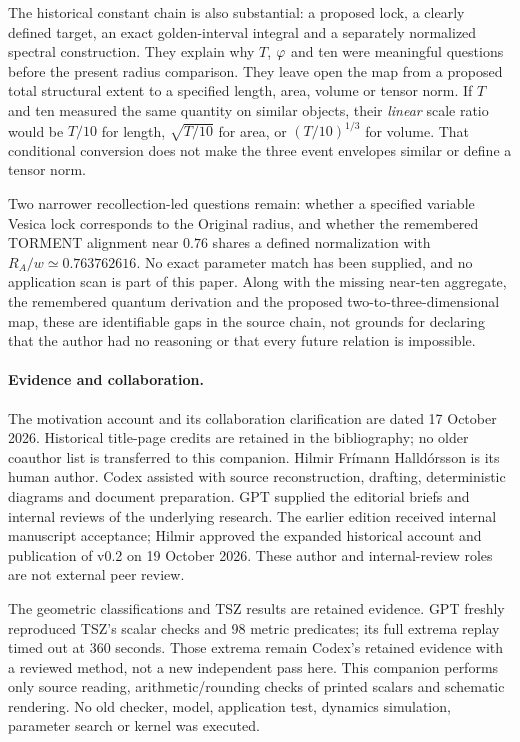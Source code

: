 The historical constant chain is also substantial: a proposed lock, a clearly defined target, an exact golden-interval integral and a separately normalized spectral construction. They explain why $T$, $\varphi$ and ten were meaningful questions before the present radius comparison. They leave open the map from a proposed total structural extent to a specified length, area, volume or tensor norm. If $T$ and ten measured the same quantity on similar objects, their \emph{linear} scale ratio would be $T/10$ for length, $\sqrt{T/10}$ for area, or $(T/10)^{1/3}$ for volume. That conditional conversion does not make the three event envelopes similar or define a tensor norm.~\cite[Sec.~14]{SP}

Two narrower recollection-led questions remain: whether a specified variable Vesica lock corresponds to the Original radius, and whether the remembered TORMENT alignment near $0.76$ shares a defined normalization with $R_A/w\simeq0.763762616$. No exact parameter match has been supplied, and no application scan is part of this paper. Along with the missing near-ten aggregate, the remembered quantum derivation and the proposed two-to-three-dimensional map, these are identifiable gaps in the source chain, not grounds for declaring that the author had no reasoning or that every future relation is impossible.~\cite{Intent}

\paragraph{Evidence and collaboration.}
The motivation account and its collaboration clarification are dated 17 October 2026. Historical title-page credits are retained in the bibliography; no older coauthor list is transferred to this companion. Hilmir Fr\'imann Halld\'orsson is its human author. Codex assisted with source reconstruction, drafting, deterministic diagrams and document preparation. GPT supplied the editorial briefs and internal reviews of the underlying research. The earlier edition received internal manuscript acceptance; Hilmir approved the expanded historical account and publication of v0.2 on 19 October 2026. These author and internal-review roles are not external peer review.

The geometric classifications and TSZ results are retained evidence. GPT freshly reproduced TSZ's scalar checks and 98 metric predicates; its full extrema replay timed out at 360 seconds. Those extrema remain Codex's retained evidence with a reviewed method, not a new independent pass here. This companion performs only source reading, arithmetic/rounding checks of printed scalars and schematic rendering. No old checker, model, application test, dynamics simulation, parameter search or kernel was executed.~\cite{TSZReview}


